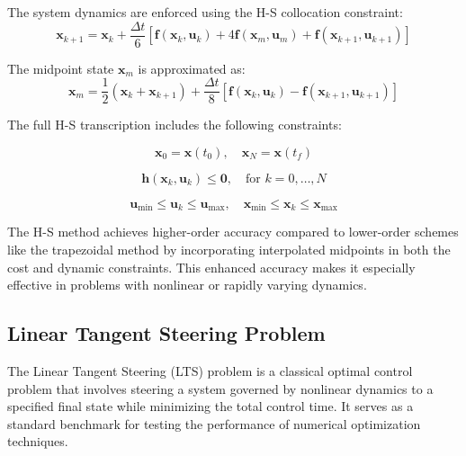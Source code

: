 The system dynamics are enforced using the H-S collocation constraint:
\begin{equation}
\mathbf{x}_{k+1} = \mathbf{x}_k + \frac{\Delta t}{6} \left[ \mathbf{f}(\mathbf{x}_k, \mathbf{u}_k) + 4 \mathbf{f}(\mathbf{x}_m, \mathbf{u}_m) + \mathbf{f}(\mathbf{x}_{k+1}, \mathbf{u}_{k+1}) \right]
\tag*{\hfill Collocation Constraint}
\label{eq:hs_dynamics}
\end{equation}

The midpoint state \( \mathbf{x}_m \) is approximated as:
\begin{equation}
\mathbf{x}_m = \frac{1}{2}(\mathbf{x}_k + \mathbf{x}_{k+1}) + \frac{\Delta t}{8} \left[ \mathbf{f}(\mathbf{x}_k, \mathbf{u}_k) - \mathbf{f}(\mathbf{x}_{k+1}, \mathbf{u}_{k+1}) \right]
\tag*{\hfill Midpoint State Estimation}
\label{eq:hs_xm}
\end{equation}

The full H-S transcription includes the following constraints:

\begin{equation}
\mathbf{x}_0 = \mathbf{x}(t_0), \quad \mathbf{x}_N = \mathbf{x}(t_f)
\tag*{\hfill Boundary Conditions}
\label{eq:hs_bc}
\end{equation}

\begin{equation}
\mathbf{h}(\mathbf{x}_k, \mathbf{u}_k) \leq \mathbf{0}, \quad \text{for } k = 0, \dots, N
\tag*{\hfill Path Constraints}
\label{eq:hs_path}
\end{equation}

\begin{equation}
\mathbf{u}_{\min} \leq \mathbf{u}_k \leq \mathbf{u}_{\max}, \quad \mathbf{x}_{\min} \leq \mathbf{x}_k \leq \mathbf{x}_{\max}
\tag*{\hfill Control and State Bounds}
\label{eq:hs_bounds}
\end{equation}

The H-S method achieves higher-order accuracy compared to lower-order schemes like the trapezoidal method by incorporating interpolated midpoints in both the cost and dynamic constraints. This enhanced accuracy makes it especially effective in problems with nonlinear or rapidly varying dynamics.


\subsection{Linear Tangent Steering Problem}
\label{sec:time_optimal}

The Linear Tangent Steering (LTS) problem \cite{bryson2018applied} is a classical optimal control problem that involves steering a system governed by nonlinear dynamics to a specified final state while minimizing the total control time. It serves as a standard benchmark for testing the performance of numerical optimization techniques.

